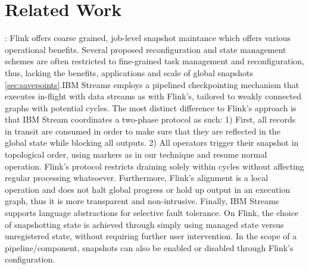 
\section{Related Work}
\label{sec:related}
: Flink offers coarse grained, job-level snapshot maintance which offers various operational benefits. Several proposed reconfiguration and state management schemes \cite{castro2013integrating} are often restricted to fine-grained task management and reconfiguration, thus, lacking the benefits, applications and scale of global snapshots \autoref{sec:savepoints}.IBM Streams employs a pipelined checkpointing mechanism \cite{jacques2016consistent} that executes in-flight with data streams as with Flink's, tailored to weakly connected graphs with potential cycles. The most distinct difference to Flink's approach is that IBM Stream coordinates a two-phase protocol as such: 1) First, all records in transit are consumed in order to make sure that they are reflected in the global state while blocking all outputs. 2) All operators trigger their snapshot in topological order, using markers as in our technique and resume normal operation. Flink's protocol restricts draining solely within cycles without affecting regular processing whatsoever. Furthermore, Flink's alignment is a local operation and does not halt global progress or hold up output in an execution graph, thus it is more transparent and non-intrusive. Finally, IBM Streams supports language abstractions for selective fault tolerance. On Flink, the choice of snapshotting state is achieved through simply using managed state versus unregistered state, without requiring further user intervention. In the scope of a pipeline/component, snapshots can also be enabled or disabled through Flink's configuration. 

